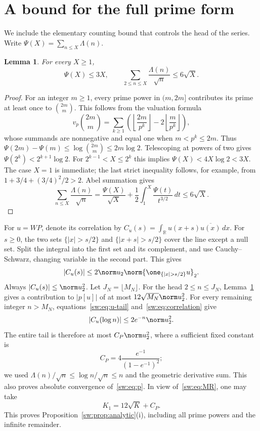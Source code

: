 \documentclass[11pt,a4paper]{article}
\numberwithin{equation}{section}
\newtheorem{lemma}[theorem]{Lemma}
\theoremstyle{definition}\newtheorem{definition}[theorem]{Definition}
\theoremstyle{remark}\newtheorem{remark}[theorem]{Remark}
\newcommand{\R}{\mathbb R}\newcommand{\C}{\mathbb C}\newcommand{\N}{\mathbb N}
\begin{document}
\section{A bound for the full prime form}\label{sw:sec:prime}
We include the elementary counting bound that controls the head of the series. Write $\Psi(X)=\sum_{n\le X}\Lambda(n)$.

\begin{lemma}\label{sw:lem:cheb}
For every $X\ge1$,
\begin{equation}\label{sw:eq:cheb}
 \Psi(X)\le3X,\qquad
 \sum_{2\le n\le X}\frac{\Lambda(n)}{\sqrt n}\le6\sqrt X.
\end{equation}
\end{lemma}
\begin{proof}
For an integer $m\ge1$, every prime power in $(m,2m]$ contributes its prime at least once to $\binom{2m}{m}$. This follows from the valuation formula
\[
 v_p\binom{2m}{m}=\sum_{k\ge1}
 \left(\left\lfloor\frac{2m}{p^k}\right\rfloor
       -2\left\lfloor\frac{m}{p^k}\right\rfloor\right),
\]
whose summands are nonnegative and equal one when $m<p^k\le2m$. Thus
$\Psi(2m)-\Psi(m)\le\log\binom{2m}{m}\le2m\log2$.
Telescoping at powers of two gives $\Psi(2^k)<2^{k+1}\log2$. For $2^{k-1}<X\le2^k$ this implies
$\Psi(X)<4X\log2<3X$. The case $X=1$ is immediate; the last strict inequality follows, for example, from $1+3/4+(3/4)^2/2>2$. Abel summation gives
\[
 \sum_{n\le X}\frac{\Lambda(n)}{\sqrt n}
 =\frac{\Psi(X)}{\sqrt X}+\frac12\int_1^X\frac{\Psi(t)}{t^{3/2}}\,dt
 \le6\sqrt X.
\]
\end{proof}

For $u=WP$, denote its correlation by
$C_u(s)=\int_\R u(x+s)\overline{u(x)}\,dx$. For $s\ge0$, the two sets
$\{|x|>s/2\}$ and $\{|x+s|>s/2\}$ cover the line except a null set. Split the integral into the first set and its complement, and use Cauchy--Schwarz, changing variable in the second part. This gives
\begin{equation}\label{sw:eq:correlation}
 |C_u(s)|\le2\norm u_2\norm{\one_{\{|x|>s/2\}}u}_2.
\end{equation}
Always $|C_u(s)|\le\norm u_2^2$. Let $J_N=\lfloor M_N\rfloor$. For the head $2\le n\le J_N$, Lemma~\ref{sw:lem:cheb} gives a contribution to $|p[u]|$ of at most $12\sqrt{M_N}\norm u_2^2$. For every remaining integer $n>M_N$, equations~\eqref{sw:eq:u-tail} and~\eqref{sw:eq:correlation} give
\[
 |C_u(\log n)|\le2e^{-n}\norm u_2^2.
\]
The entire tail is therefore at most $C_P\norm u_2^2$, where a sufficient fixed constant is
\begin{equation}\label{sw:eq:CP}
 C_P=4\frac{e^{-1}}{(1-e^{-1})^2};
\end{equation}
we used $\Lambda(n)/\sqrt n\le\log n/\sqrt n\le n$ and the geometric derivative sum. This also proves absolute convergence of~\eqref{sw:eq:p}. In view of~\eqref{sw:eq:MR}, one may take
\begin{equation}\label{sw:eq:K1}
 K_1=12\sqrt K+C_P.
\end{equation}
This proves Proposition~\ref{sw:prop:analytic}(i), including all prime powers and the infinite remainder.
\end{document}
